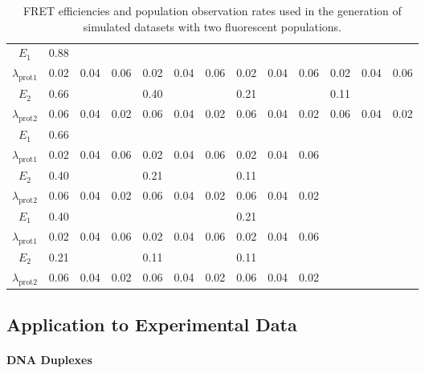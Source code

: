 \begin{center}
\begin{table}[ht]
\begin{tabular}{|ccccccccccccc|}
\hline
\textbf{$E_1$} & 0.88 & & & & & & & & & & & \\   
\textbf{$\lambda_{\text{prot} 1}$} & 0.02 & 0.04 & 0.06 & 0.02 & 0.04 & 0.06 & 0.02 & 0.04 & 0.06 & 0.02 & 0.04 & 0.06\\ 
\textbf{$E_2$} & 0.66 & & & 0.40 & & & 0.21 & & & 0.11 & & \\ 
\textbf{$\lambda_{\text{prot} 2}$} & 0.06 & 0.04 & 0.02 & 0.06 & 0.04 & 0.02 & 0.06 & 0.04 & 0.02 & 0.06 & 0.04 & 0.02 \\ 
\hline
\textbf{$E_1$} & 0.66 & & & & & & & & & & & \\ 
\textbf{$\lambda_{\text{prot} 1}$} & 0.02 & 0.04 & 0.06 & 0.02 & 0.04 & 0.06 & 0.02 & 0.04 & 0.06 & & & \\ 
\textbf{$E_2$} & 0.40 & & & 0.21 & & & 0.11 & & & & & \\
\textbf{$\lambda_{\text{prot} 2}$} & 0.06 & 0.04 & 0.02 & 0.06 & 0.04 & 0.02 & 0.06 & 0.04 & 0.02 & & & \\
\hline
\textbf{$E_1$} & 0.40 & & & & & & 0.21 & & & & & \\
\textbf{$\lambda_{\text{prot} 1}$} & 0.02 & 0.04 & 0.06 & 0.02 & 0.04 & 0.06 & 0.02 & 0.04 & 0.06 & & & \\
\textbf{$E_2$} & 0.21 & & & 0.11 & & & 0.11 & & & & & \\  
\textbf{$\lambda_{\text{prot} 2}$} & 0.06 & 0.04 & 0.02 & 0.06 & 0.04 & 0.02 & 0.06 & 0.04 & 0.02 & & & \\
\hline
\end{tabular}
\caption{FRET efficiencies and population observation rates used in the generation of simulated datasets with two fluorescent populations.}
\label{tab:rates}
\end{table} 
\end{center}

\subsection{Application to Experimental Data}
\paragraph*{DNA Duplexes}

